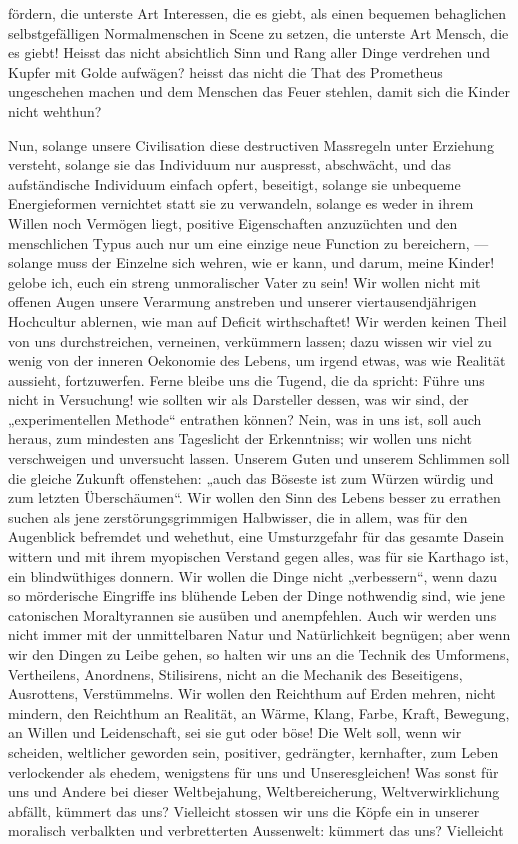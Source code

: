 fördern, die unterste Art Interessen, die es giebt, als einen bequemen behaglichen selbstgefälligen Normalmenschen in Scene zu setzen, die unterste Art Mensch, die es giebt! Heisst das nicht absichtlich Sinn und Rang aller Dinge verdrehen und Kupfer mit Golde aufwägen? heisst das nicht die That des Prometheus ungeschehen machen und dem Menschen das Feuer stehlen, damit sich die Kinder nicht wehthun?
\par

Nun, solange unsere Civilisation diese destructiven Massregeln unter Erziehung versteht, solange sie das Individuum nur auspresst, abschwächt, und das aufständische Individuum einfach opfert, beseitigt, solange sie unbequeme Energieformen vernichtet statt sie zu verwandeln, solange es weder in ihrem Willen noch Vermögen liegt, positive Eigenschaften anzuzüchten und den menschlichen Typus auch nur um eine einzige neue Function zu bereichern, — solange muss der Einzelne sich wehren, wie er kann, und darum, meine Kinder! gelobe ich, euch ein streng unmoralischer Vater zu sein! Wir wollen nicht mit offenen Augen unsere Verarmung anstreben und unserer viertausendjährigen Hochcultur ablernen, wie man auf Deficit wirthschaftet! Wir werden keinen Theil von uns durchstreichen, verneinen, verkümmern lassen; dazu wissen wir viel zu wenig von der inneren Oekonomie des Lebens, um irgend etwas, was wie Realität aussieht, fortzuwerfen. Ferne bleibe uns die Tugend, die da spricht: Führe uns nicht in Versuchung! wie sollten wir als Darsteller dessen, was wir sind, der „experimentellen Methode“ entrathen können? Nein, was in uns ist, soll auch heraus, zum mindesten ans Tageslicht der Erkenntniss; wir wollen uns nicht verschweigen und unversucht lassen. Unserem Guten und unserem Schlimmen soll die gleiche Zukunft offenstehen: „auch das Böseste ist zum Würzen würdig und zum letzten Überschäumen“. Wir wollen den Sinn des Lebens besser zu errathen suchen als jene zerstörungsgrimmigen Halbwisser, die in allem, was für den Augenblick befremdet und wehethut, eine Umsturzgefahr für das gesamte Dasein wittern und mit ihrem myopischen Verstand gegen alles, was für sie Karthago ist, ein blindwüthiges  donnern. Wir wollen die Dinge nicht „verbessern“, wenn dazu so mörderische Eingriffe ins blühende Leben der Dinge nothwendig sind, wie jene catonischen Moraltyrannen sie ausüben und anempfehlen. Auch wir werden uns nicht immer mit der unmittelbaren Natur und Natürlichkeit begnügen; aber wenn wir den Dingen zu Leibe gehen, so halten wir uns an die Technik des Umformens, Vertheilens, Anordnens, Stilisirens, nicht an die Mechanik des Beseitigens, Ausrottens, Verstümmelns. Wir wollen den Reichthum auf Erden mehren, nicht mindern, den Reichthum an Realität, an Wärme, Klang, Farbe, Kraft, Bewegung, an Willen und Leidenschaft, sei sie gut oder böse! Die Welt soll, wenn wir scheiden, weltlicher geworden sein, positiver, gedrängter, kernhafter, zum Leben verlockender als ehedem, wenigstens für uns und Unseresgleichen! Was sonst für uns und Andere bei dieser Weltbejahung, Weltbereicherung, Weltverwirklichung abfällt, kümmert das uns? Vielleicht stossen wir uns die Köpfe ein in unserer moralisch verbalkten und verbretterten Aussenwelt: kümmert das uns? Vielleicht 